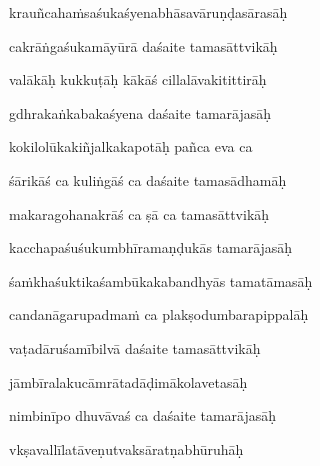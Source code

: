 krauñcaha\.msaśukaśyenabhāsavāruṇḍasārasāḥ\thinspace{\dandab} \dontdisplaylinenum

cakrāṅgaśukamāyūrā daśaite tamasāttvikāḥ \veg\dontdisplaylinenum

valākāḥ kukkuṭāḥ kākāś cillalāvakitittirāḥ\thinspace{\dandab} \dontdisplaylinenum

gdhrakaṅkabakaśyena daśaite tamarājasāḥ \veg\dontdisplaylinenum

kokilolūkakiñjalkakapotāḥ pañca eva ca\thinspace{\dandab} \dontdisplaylinenum

śārikāś ca kuliṅgāś ca daśaite tamasādhamāḥ \veg\dontdisplaylinenum

makaragohanakrāś ca ṣā ca tamasāttvikāḥ\thinspace{\dandab} \dontdisplaylinenum

kacchapaśuśukumbhīramaṇḍukās tamarājasāḥ \veg\dontdisplaylinenum

śa\.mkhaśuktikaśambūkakabandhyās tamatāmasāḥ\thinspace{\dandab} \dontdisplaylinenum

candanāgarupadma\.m ca plakṣodumbarapippalāḥ \veg\dontdisplaylinenum

vaṭadāruśamībilvā daśaite tamasāttvikāḥ\thinspace{\dandab} \dontdisplaylinenum

jāmbīralakucāmrātadāḍimākolavetasāḥ \veg\dontdisplaylinenum

nimbinīpo dhuvāvaś ca daśaite tamarājasāḥ\thinspace{\dandab} \dontdisplaylinenum

vkṣavallīlatāveṇutvaksāratṇabhūruhāḥ \veg\dontdisplaylinenum

